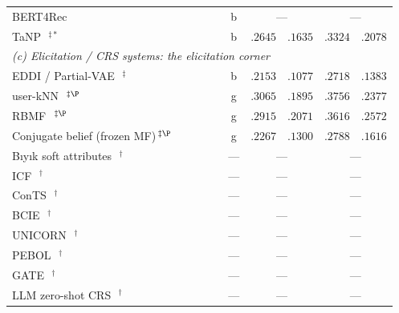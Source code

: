 \documentclass[manuscript,screen,review]{acmart}
\newcommand{\cmark}{\ding{51}}
\newcommand{\xmark}{\ding{55}}
\begin{document}
\begin{table}[t]
\begin{tabular}{p{4.9cm}cccc c r@{\,/\,}l r@{\,/\,}l}
BERT4Rec~\citep{sun2019bert4rec} & \xmark & \xmark & \xmark & \xmark & b & \multicolumn{2}{c}{---} & \multicolumn{2}{c}{---} \\
TaNP~\citep{lin2021tanp}\,$^{\ddagger\ast}$ & \xmark & \xmark & \xmark & \cmark & b & $.2645$ & $.1635$ & $.3324$ & $.2078$ \\
\midrule
\multicolumn{10}{l}{\emph{(c) Elicitation / CRS systems: the elicitation corner}}\\
EDDI / Partial-VAE~\citep{ma2019eddi}\,$^{\ddagger}$ & \xmark & \xmark & \xmark & \cmark & b & $.2153$ & $.1077$ & $.2718$ & $.1383$ \\
user-kNN~\citep{golbandi2011adaptive}\,$^{\ddagger\P}$ & \xmark & \xmark & \xmark & \cmark & g & $.3065$ & $.1895$ & $.3756$ & $.2377$ \\
RBMF~\citep{liu2011wisdom,zhou2011functional}\,$^{\ddagger\P}$ & \xmark & \xmark & \xmark & \cmark & g & $.2915$ & $.2071$ & $.3616$ & $.2572$ \\
Conjugate belief (frozen MF)\,$^{\ddagger\P}$ & \xmark & \xmark & \xmark & \cmark & g & $.2267$ & $.1300$ & $.2788$ & $.1616$ \\
B\i y\i k soft attributes~\citep{biyik2023soft}\,$^{\dagger}$ & \xmark & \xmark & \xmark & \cmark & --- & \multicolumn{2}{c}{---} & \multicolumn{2}{c}{---} \\
ICF~\citep{zhao2013interactive}\,$^{\dagger}$ & \xmark & \xmark & \xmark & \cmark & --- & \multicolumn{2}{c}{---} & \multicolumn{2}{c}{---} \\
ConTS~\citep{li2021seamlessly}\,$^{\dagger}$ & \xmark & \xmark & \xmark & \xmark & --- & \multicolumn{2}{c}{---} & \multicolumn{2}{c}{---} \\
BCIE~\citep{toroghi2023bcie}\,$^{\dagger}$ & \xmark & \xmark & \cmark & \xmark & --- & \multicolumn{2}{c}{---} & \multicolumn{2}{c}{---} \\
UNICORN~\citep{deng2021unicorn}\,$^{\dagger}$ & \xmark & \xmark & \xmark & \xmark & --- & \multicolumn{2}{c}{---} & \multicolumn{2}{c}{---} \\
PEBOL~\citep{austin2024bayesian}\,$^{\dagger}$ & \xmark & \cmark & \xmark & \xmark & --- & \multicolumn{2}{c}{---} & \multicolumn{2}{c}{---} \\
GATE~\citep{li2023eliciting}\,$^{\dagger}$ & \xmark & \cmark & \xmark & \cmark & --- & \multicolumn{2}{c}{---} & \multicolumn{2}{c}{---} \\
LLM zero-shot CRS~\citep{he2023large}\,$^{\dagger}$ & \xmark & \cmark & \xmark & \cmark & --- & \multicolumn{2}{c}{---} & \multicolumn{2}{c}{---} \\

\end{tabular}
\end{table}
\end{document}
